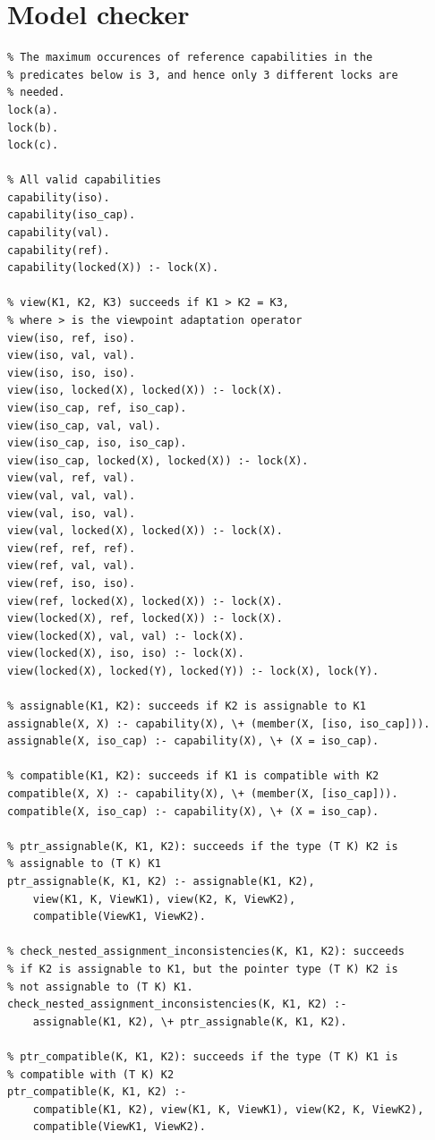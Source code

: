 \chapter{Model checker} \label{appendix:prolog}
\begin{verbatim}
% The maximum occurences of reference capabilities in the 
% predicates below is 3, and hence only 3 different locks are 
% needed.
lock(a).
lock(b).
lock(c).

% All valid capabilities
capability(iso).
capability(iso_cap).
capability(val).
capability(ref).
capability(locked(X)) :- lock(X).

% view(K1, K2, K3) succeeds if K1 > K2 = K3, 
% where > is the viewpoint adaptation operator
view(iso, ref, iso).
view(iso, val, val).
view(iso, iso, iso).
view(iso, locked(X), locked(X)) :- lock(X).
view(iso_cap, ref, iso_cap).
view(iso_cap, val, val).
view(iso_cap, iso, iso_cap).
view(iso_cap, locked(X), locked(X)) :- lock(X).
view(val, ref, val).
view(val, val, val).
view(val, iso, val).
view(val, locked(X), locked(X)) :- lock(X).
view(ref, ref, ref).
view(ref, val, val).
view(ref, iso, iso).
view(ref, locked(X), locked(X)) :- lock(X).
view(locked(X), ref, locked(X)) :- lock(X).
view(locked(X), val, val) :- lock(X).
view(locked(X), iso, iso) :- lock(X).
view(locked(X), locked(Y), locked(Y)) :- lock(X), lock(Y).

% assignable(K1, K2): succeeds if K2 is assignable to K1
assignable(X, X) :- capability(X), \+ (member(X, [iso, iso_cap])).
assignable(X, iso_cap) :- capability(X), \+ (X = iso_cap).

% compatible(K1, K2): succeeds if K1 is compatible with K2
compatible(X, X) :- capability(X), \+ (member(X, [iso_cap])).
compatible(X, iso_cap) :- capability(X), \+ (X = iso_cap).

% ptr_assignable(K, K1, K2): succeeds if the type (T K) K2 is 
% assignable to (T K) K1
ptr_assignable(K, K1, K2) :- assignable(K1, K2),
    view(K1, K, ViewK1), view(K2, K, ViewK2),
    compatible(ViewK1, ViewK2).

% check_nested_assignment_inconsistencies(K, K1, K2): succeeds 
% if K2 is assignable to K1, but the pointer type (T K) K2 is 
% not assignable to (T K) K1.
check_nested_assignment_inconsistencies(K, K1, K2) :- 
    assignable(K1, K2), \+ ptr_assignable(K, K1, K2).

% ptr_compatible(K, K1, K2): succeeds if the type (T K) K1 is 
% compatible with (T K) K2
ptr_compatible(K, K1, K2) :- 
    compatible(K1, K2), view(K1, K, ViewK1), view(K2, K, ViewK2), 
    compatible(ViewK1, ViewK2).


\end{verbatim}
